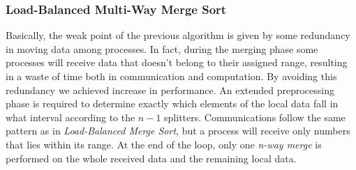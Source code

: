 \subsubsection{Load-Balanced Multi-Way Merge Sort}
Basically, the weak point of the previous algorithm is given by some redundancy in moving data among processes. In fact, during the merging phase some processes will receive data that doesn't belong to their assigned range, resulting in a waste of time both in communication and computation. By avoiding this redundancy we achieved increase in performance. An extended preprocessing phase is required to determine exactly which elements of the local data fall in what interval according to the $n-1$ splitters. Communications follow the same pattern as in \textit{Load-Balanced Merge Sort}, but a process will receive only numbers that lies within its range. At the end of the loop, only one \textit{n-way merge} is performed on the whole received data and the remaining local data.

